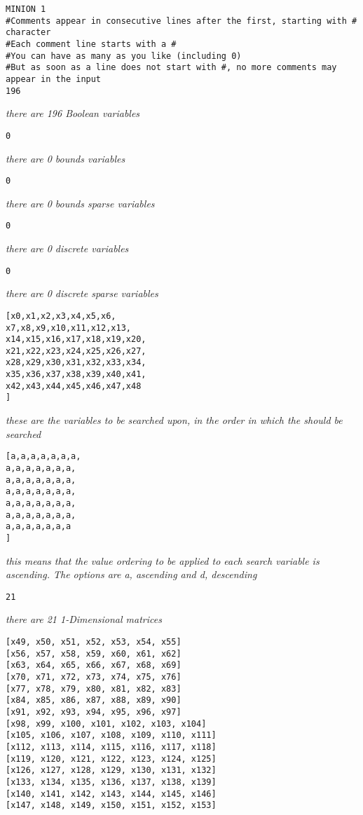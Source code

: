 \documentclass{article}
\begin{document}
\begin{small}
\begin{verbatim}
MINION 1
#Comments appear in consecutive lines after the first, starting with # character
#Each comment line starts with a #
#You can have as many as you like (including 0)
#But as soon as a line does not start with #, no more comments may appear in the input
196
\end{verbatim}
\emph{there are 196 Boolean variables}
\begin{verbatim}
0
\end{verbatim}
\emph{there are 0 bounds variables}
\begin{verbatim}
0
\end{verbatim}
\emph{there are 0 bounds sparse variables}
\begin{verbatim}
0
\end{verbatim}
\emph{there are 0 discrete variables}
\begin{verbatim}
0
\end{verbatim}
\emph{there are 0 discrete sparse variables}
\begin{verbatim}
[x0,x1,x2,x3,x4,x5,x6,
x7,x8,x9,x10,x11,x12,x13,
x14,x15,x16,x17,x18,x19,x20,
x21,x22,x23,x24,x25,x26,x27,
x28,x29,x30,x31,x32,x33,x34,
x35,x36,x37,x38,x39,x40,x41,
x42,x43,x44,x45,x46,x47,x48
]
\end{verbatim}
\emph{these are the variables to be searched upon, in the order in which the should be searched}
\begin{verbatim}
[a,a,a,a,a,a,a,
a,a,a,a,a,a,a,
a,a,a,a,a,a,a,
a,a,a,a,a,a,a,
a,a,a,a,a,a,a,
a,a,a,a,a,a,a,
a,a,a,a,a,a,a
]
\end{verbatim}
\emph{this means that the value ordering to be applied to each search variable is ascending. The options are a, ascending and d, descending}
\begin{verbatim}
21
\end{verbatim}
\emph{there are 21 1-Dimensional matrices}
\begin{verbatim}
[x49, x50, x51, x52, x53, x54, x55]
[x56, x57, x58, x59, x60, x61, x62]
[x63, x64, x65, x66, x67, x68, x69]
[x70, x71, x72, x73, x74, x75, x76]
[x77, x78, x79, x80, x81, x82, x83]
[x84, x85, x86, x87, x88, x89, x90]
[x91, x92, x93, x94, x95, x96, x97]
[x98, x99, x100, x101, x102, x103, x104]
[x105, x106, x107, x108, x109, x110, x111]
[x112, x113, x114, x115, x116, x117, x118]
[x119, x120, x121, x122, x123, x124, x125]
[x126, x127, x128, x129, x130, x131, x132]
[x133, x134, x135, x136, x137, x138, x139]
[x140, x141, x142, x143, x144, x145, x146]
[x147, x148, x149, x150, x151, x152, x153]

\end{verbatim}
\end{small}
\end{document}
